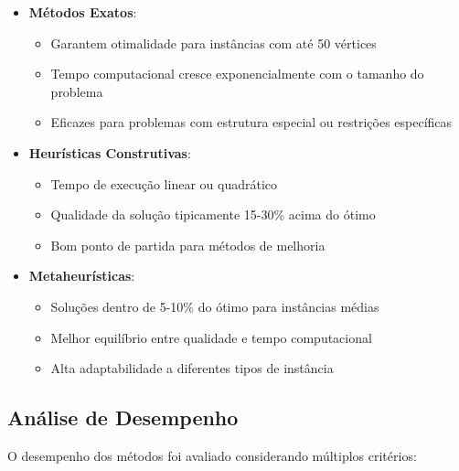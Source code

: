 \documentclass[12pt, a4paper]{report}
\begin{document}
\begin{itemize}
    \item \textbf{Métodos Exatos}:
    \begin{itemize}
        \item Garantem otimalidade para instâncias com até 50 vértices
        \item Tempo computacional cresce exponencialmente com o tamanho do problema
        \item Eficazes para problemas com estrutura especial ou restrições específicas
    \end{itemize}
    
    \item \textbf{Heurísticas Construtivas}:
    \begin{itemize}
        \item Tempo de execução linear ou quadrático
        \item Qualidade da solução tipicamente 15-30\% acima do ótimo
        \item Bom ponto de partida para métodos de melhoria
    \end{itemize}
    
    \item \textbf{Metaheurísticas}:
    \begin{itemize}
        \item Soluções dentro de 5-10\% do ótimo para instâncias médias
        \item Melhor equilíbrio entre qualidade e tempo computacional
        \item Alta adaptabilidade a diferentes tipos de instância
    \end{itemize}
\end{itemize}

\subsection{Análise de Desempenho}
O desempenho dos métodos foi avaliado considerando múltiplos critérios:
\end{document}
